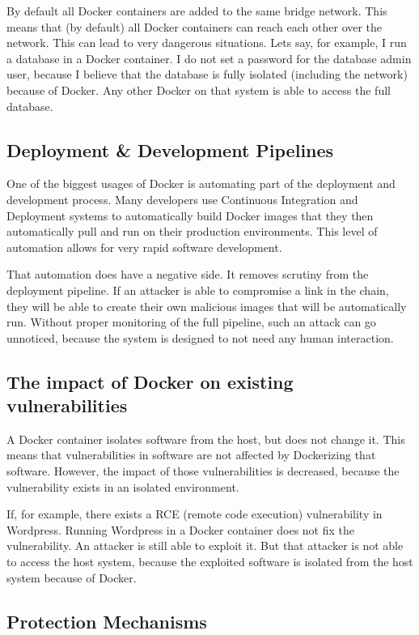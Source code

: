 \hfill

By default all Docker containers are added to the same bridge network. This means that (by default) all Docker containers can reach each other over the network. This can lead to very dangerous situations. Lets say, for example, I run a database in a Docker container. I do not set a password for the database admin user, because I believe that the database is fully isolated (including the network) because of Docker. Any other Docker on that system is able to access the full database.


\subsection{Deployment \& Development Pipelines}
One of the biggest usages of Docker is automating part of the deployment and development process. Many developers use Continuous Integration and Deployment systems to automatically build Docker images that they then automatically pull and run on their production environments. This level of automation allows for very rapid software development.

That automation does have a negative side. It removes scrutiny from the deployment pipeline. If an attacker is able to compromise a link in the chain, they will be able to create their own malicious images that will be automatically run. Without proper monitoring of the full pipeline, such an attack can go unnoticed, because the system is designed to not need any human interaction.

\subsection{The impact of Docker on existing vulnerabilities}
A Docker container isolates software from the host, but does not change it. This means that vulnerabilities in software are not affected by Dockerizing that software. However, the impact of those vulnerabilities is decreased, because the vulnerability exists in an isolated environment.

If, for example, there exists a RCE (remote code execution) vulnerability in Wordpress. Running Wordpress in a Docker container does not fix the vulnerability. An attacker is still able to exploit it. But that attacker is not able to access the host system, because the exploited software is isolated from the host system because of Docker.

\subsection{Protection Mechanisms}
